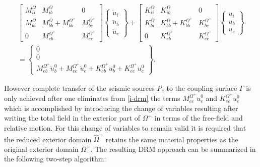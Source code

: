 \documentclass[12pt,letterpaper]{article}
\begin{document}
\begin{equation}
\begin{array}{l}
\left[ {\begin{array}{*{20}{c}}
{M_{ii}^\Omega }&{M_{ib}^\Omega }&0\\
{M_{bi}^\Omega }&{M_{bb}^\Omega  + M_{bb}^{{\Omega ^ + }}}&{M_{be}^{{\Omega ^ + }}}\\
0&{M_{eb}^{{\Omega ^ + }}}&{M_{ee}^{{\Omega ^ + }}}
\end{array}} \right]\left\{ {\begin{array}{*{20}{c}}
{{{\ddot u}_i}}\\
{{{\ddot u}_b}}\\
{{{\ddot u}_e}}
\end{array}} \right\} + \left[ {\begin{array}{*{20}{c}}
{K_{ii}^\Omega }&{K_{ib}^\Omega }&0\\
{K_{bi}^\Omega }&{K_{bb}^\Omega  + K_{bb}^{{\Omega ^ + }}}&{K_{be}^{{\Omega ^ + }}}\\
0&{K_{eb}^{{\Omega ^ + }}}&{K_{ee}^{{\Omega ^ + }}}
\end{array}} \right]\left\{ {\begin{array}{*{20}{c}}
{{u_i}}\\
{{u_b}}\\
{{u_e}}
\end{array}} \right\}\\
 = \left\{ {\begin{array}{*{20}{c}}
0\\
0\\
{M_{eb}^{{\Omega ^ + }}\ddot u_b^0 + M_{ee}^{{\Omega ^ + }}\ddot u_e^0 + K_{eb}^{{\Omega ^ + }}u_b^0 + K_{ee}^{{\Omega ^ + }}u_e^0}
\end{array}} \right\}.
\end{array}
\label{i-drm}
\end{equation}

However complete transfer of the seismic sources $P_e$ to the coupling surface $\Gamma$ is only achieved after one eliminates from \cref{i-drm} the terms $M_{ee}^{{\Omega ^ + }}\ddot u_e^0$ and ${K_{ee}^{{\Omega ^ + }}u_e^0}$ which is accomplished by introducing the change of variables resulting after writing the total field in the exterior part of $\Omega^+$ in terms of the free-field and relative motion. For this change of variables to remain valid it is required that the reduced exterior domain $\hat{\Omega}^+$ retains the same material properties as the original exterior domain $\Omega^+$. The resulting DRM approach can be summarized in the following two-step algorithm:
\end{document}
